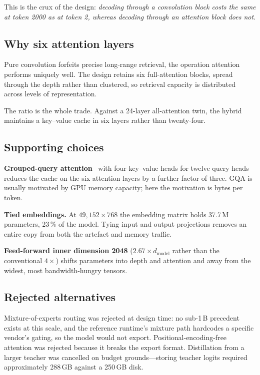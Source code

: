 \documentclass[conference]{IEEEtran}
\begin{document}
This is the crux of the design: \emph{decoding through a convolution block costs
the same at token 2000 as at token 2, whereas decoding through an attention
block does not.}

\subsection{Why six attention layers}

Pure convolution forfeits precise long-range retrieval, the operation attention
performs uniquely well. The design retains six full-attention blocks, spread
through the depth rather than clustered, so retrieval capacity is distributed
across levels of representation.

The ratio is the whole trade. Against a 24-layer all-attention twin, the hybrid
maintains a key--value cache in six layers rather than twenty-four.

\subsection{Supporting choices}

\textbf{Grouped-query attention}~\cite{gqa} with four key--value heads for twelve
query heads reduces the cache on the six attention layers by a further factor of
three. GQA is usually motivated by GPU memory capacity; here the motivation is
bytes per token.

\textbf{Tied embeddings.} At $49{,}152 \times 768$ the embedding matrix holds
37.7\,M parameters, 23\,\% of the model. Tying input and output projections
removes an entire copy from both the artefact and memory traffic.

\textbf{Feed-forward inner dimension 2048} ($2.67\times d_{\text{model}}$ rather
than the conventional $4\times$) shifts parameters into depth and attention and
away from the widest, most bandwidth-hungry tensors.

\subsection{Rejected alternatives}

Mixture-of-experts routing was rejected at design time: no sub-1\,B precedent
exists at this scale, and the reference runtime's mixture path hardcodes a
specific vendor's gating, so the model would not export. Positional-encoding-free
attention was rejected because it breaks the export format. Distillation from a
larger teacher was cancelled on budget grounds---storing teacher logits required
approximately 288\,GB against a 250\,GB disk.
\end{document}
